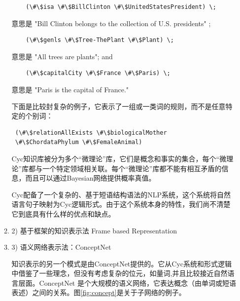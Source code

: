 \begin{enumerate}
\begin{enumerate}
 {\tt\begin{small}\begin{lstlisting}
    (\#\$isa \#\$BillClinton \#\$UnitedStatesPresident) \;
    \end{lstlisting}\end{small}}

\noindent 意思是 "Bill Clinton belongs to the collection of U.S. presidents" ;

 {\tt\begin{small}\begin{lstlisting}
    (\#\$genls \#\$Tree-ThePlant \#\$Plant) \;
    \end{lstlisting}\end{small}}

\noindent 意思是 "All trees are plants"; and

 {\tt\begin{small}\begin{lstlisting}
    (\#\$capitalCity \#\$France \#\$Paris) \;
    \end{lstlisting}\end{small}}

\noindent 意思是 "Paris is the capital of France."


下面是比较封复杂的例子，它表示了一组或一类词的规则，而不是任意特定的个别词：

 {\tt\begin{small}\begin{lstlisting}
 (\#\$relationAllExists \#\$biologicalMother
 \#\$ChordataPhylum \#\$FemaleAnimal)
    \end{lstlisting}\end{small}}


Cyc知识库被分为多个“微理论”库，它们是概念和事实的集合，每个“微理论”库都与一个特定领域相关联。每个“微理论”库都不能有相互矛盾的信息，而且可以通过Bayesian网络提供概率真值。

Cyc配备了一个复杂的、基于短语结构语法的NLP系统，这个系统将自然语言句子映射为Cyc逻辑形式。由于这个系统本身的特性，我们尚不清楚它到底具有什么样的优点和缺点。

\item2) 基于框架的知识表示法 Frame based Representation

\item3) 语义网络表示法：ConceptNet \cite{Robert2012}

知识表示的另一个模式是由ConceptNet提供的\cite{Liu2004}。它从Cyc系统和形式逻辑中借鉴了一些理念，但没有考虑复杂的位元，如量词,并且比较接近自然语言层面。ConceptNet 是个大规模的语义网络，它表达概念（由单词或短语表述）之间的关系。图\ref{fig:concept}是关于子网络的例子。


\end{enumerate}
\end{enumerate}
